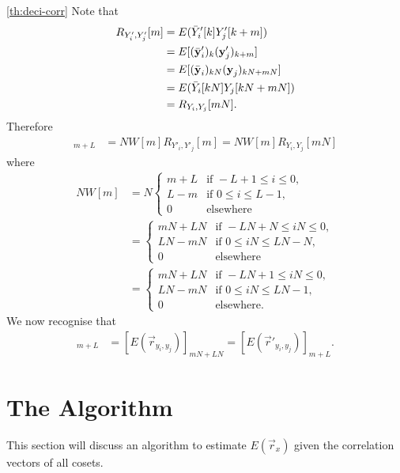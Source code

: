 \documentclass[a4paper, openany, oneside]{memoir}
\begin{document}
\begin{blockProofTheorem}{\ref{th:deci-corr}}
    Note that
    \begin{align*}
        R_{Y'_i,Y'_j}[m]
        &= E(\bar{Y}'_i[k]Y'_j[k+m]) \\
        &= E[(\bar{\boldsymbol{\mathbf{y}}}'_i)_{k}(\boldsymbol{\mathbf{y}}'_j)_{k+m}] \\
        &= E[(\bar{\boldsymbol{\mathbf{y}}}_i)_{kN}(\boldsymbol{\mathbf{y}}_j)_{kN+mN}] \\
        &= E(\bar{Y}_i[kN]Y_j[kN+mN]) \\
        &= R_{Y_i,Y_j}[mN].
    \end{align*}
    Therefore
    \begin{align*}
        [E(N\vec{r}_{y'_i,y'_j})]_{m+L}
        &= N W[m] R_{Y'_i,Y'_j}[m]
        = N W[m] R_{Y_i,Y_j}[mN]
    \end{align*}
    where
    \begin{align*}
        NW[m] &= N\begin{cases}
            m+L & \text{if } -L+1 \le i \le 0, \\
            L-m & \text{if } 0 \le i \le L - 1, \\
            0 & \text{elsewhere}
        \end{cases} \\
        &= \begin{cases}
            mN+LN & \text{if } -LN+N \le iN \le 0, \\
            LN-mN & \text{if } 0 \le iN \le LN - N,\\
            0 & \text{elsewhere}
        \end{cases} \\
        &= \begin{cases}
            mN+LN & \text{if } -LN+1 \le iN \le 0, \\
            LN-mN & \text{if } 0 \le iN \le LN - 1, \\
            0 & \text{elsewhere}.
        \end{cases}
    \end{align*}
    We now recognise that
    \begin{align*}
        [E(N\vec{r}_{y'_i,y'_j})]_{m+L} &= [E(\vec{r}_{y_i,y_j})]_{mN+LN} = [E(\vec{r}'_{y_i,y_j})]_{m+L} .
    \end{align*}
\end{blockProofTheorem}

\section{The Algorithm}
This section will discuss an algorithm to estimate $E(\vec{r}_x)$ given the correlation vectors of all cosets.
\end{document}
